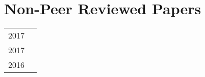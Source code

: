 \section*{Non-Peer Reviewed Papers}
\begin{tabular}{L!{\VRule}R}
2017&\\
2017&\\
2016&\\
\end{tabular}